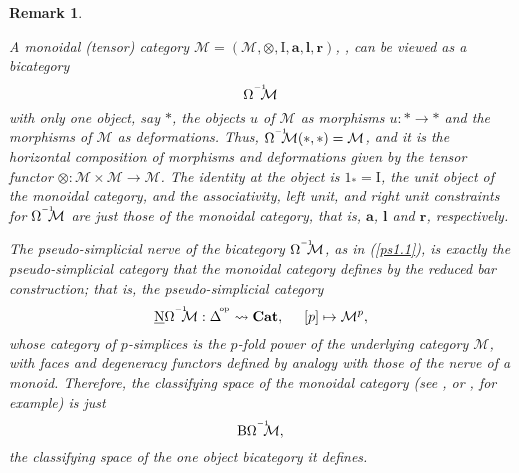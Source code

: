 \documentclass[]{amsart}
\newtheorem{remark}[theorem]{Remark}
\begin{document}
\begin{remark}\label{mono}{\em A {\em monoidal} (tensor) category ${\ensuremath{\mathcal{M}}}=({\ensuremath{\mathcal{M}}},\otimes,\text{I},\boldsymbol{a},\boldsymbol{l},\boldsymbol{r})$, \cite{maclane},  can be viewed as a
bicategory $$\Omega^{^{-1}}\hspace{-5pt}{\ensuremath{\mathcal{M}}}$$
 with only one object, say $*$,  the objects $u$ of ${\ensuremath{\mathcal{M}}}$ as morphisms $u:*\rightarrow *$ and the morphisms of ${\ensuremath{\mathcal{M}}}$
as deformations. Thus, $\Omega^{^{-1}}\hspace{-5pt}{\ensuremath{\mathcal{M}}}(*,*)={\ensuremath{\mathcal{M}}}$, and it is the horizontal
composition of morphisms and deformations given by the  tensor functor
${\otimes:{\ensuremath{\mathcal{M}}}\times{\ensuremath{\mathcal{M}}}\rightarrow{\ensuremath{\mathcal{M}}}}$. The identity at the object is $1_*=\text{I}$, the unit object
of the monoidal category, and the associativity, left unit, and right unit constraints for
$\Omega^{^{-1}}\hspace{-5pt}{\ensuremath{\mathcal{M}}}$ are just those of the monoidal category, that is,
$\boldsymbol{a}$, $\boldsymbol{l}$ and $\boldsymbol{r}$, respectively.

 The pseudo-simplicial nerve of the bicategory $\Omega^{^{-1}}\hspace{-5pt}{\ensuremath{\mathcal{M}}}$, as in (\ref{ps1.1}), is
 exactly the pseudo-simplicial category that the monoidal category  defines by the reduced bar construction; that is, the pseudo-simplicial category
$${\ensuremath{\underline{\mathrm{N}}}}\Omega^{^{-1}}\hspace{-5pt}{\ensuremath{\mathcal{M}}}:\Delta^{\!^{\mathrm{op}}}
\rightsquigarrow{\ensuremath{\mathbf{Cat}}},\hspace{0.5cm}[p]\mapsto {\ensuremath{\mathcal{M}}}^p,$$ whose category of $p$-simplices is the
$p$-fold power of the underlying category ${\ensuremath{\mathcal{M}}}$, with faces and degeneracy functors defined by
analogy with those of the nerve of a monoid. Therefore, {\em the classifying space  of the monoidal
category} (see \cite[\S 3]{jardine}, \cite[Appendix]{hinich} or \cite{b-c2}, for example) is just
$${\ensuremath{\mathrm{B}}} \Omega^{^{-1}}\hspace{-5pt}{\ensuremath{\mathcal{M}}},$$ the classifying space of the one object bicategory it
defines.

}
\end{remark}
\end{document}
